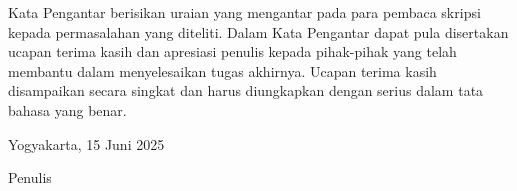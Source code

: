 Kata Pengantar berisikan uraian yang mengantar pada para pembaca skripsi kepada
permasalahan yang diteliti. Dalam Kata Pengantar dapat pula disertakan ucapan terima kasih
dan apresiasi penulis kepada pihak-pihak yang telah membantu dalam menyelesaikan tugas
akhirnya. Ucapan terima kasih disampaikan secara singkat dan harus diungkapkan dengan
serius dalam tata bahasa yang benar.   
\newline

\begin{flushright}
Yogyakarta, 15 Juni 2025
\end{flushright}
\vspace{0.5cm}
\begin{flushright}
Penulis
\end{flushright}